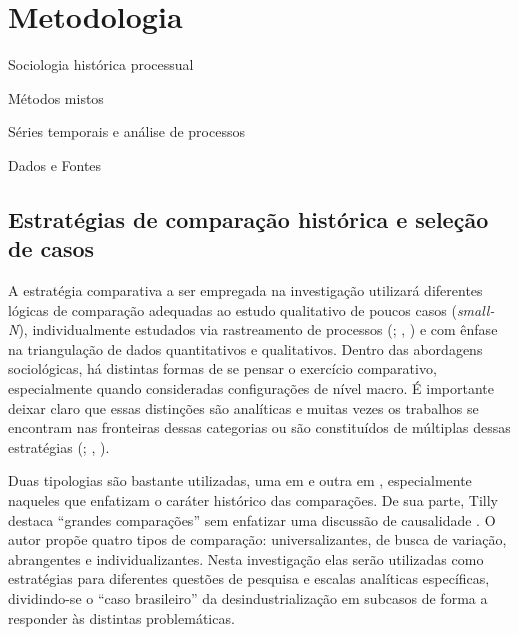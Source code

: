 \chapter{Metodologia}

\begin{esboco}
Sociologia histórica processual

Métodos mistos

Séries temporais e análise de processos

Dados e Fontes
\end{esboco}

\section{Estratégias de comparação histórica e seleção de casos}\label{estratuxe9gias-de-comparauxe7uxe3o-histuxf3rica-e-seleuxe7uxe3o-de-casos}

A estratégia comparativa a ser empregada na investigação utilizará
diferentes lógicas de comparação \citep{tilly_big_1984} adequadas ao
estudo qualitativo de poucos casos (\emph{small-N}), individualmente
estudados via rastreamento de processos (; \citeauthor{mahoney_process_2015}, \citeyear{mahoney_process_2015})
e com ênfase na triangulação de dados quantitativos e qualitativos.
Dentro das abordagens sociológicas, há distintas formas de se pensar o
exercício comparativo, especialmente quando consideradas configurações
de nível macro. É importante deixar claro que essas distinções são
analíticas e muitas vezes os trabalhos se encontram nas fronteiras
dessas categorias ou são constituídos de múltiplas dessas estratégias
(; \citeauthor{tilly_big_1984}, \citeyear{tilly_big_1984}).

Duas tipologias são bastante utilizadas, uma em \citet{tilly_big_1984} e
outra em \citet{skocpol_uses_1980}, especialmente naqueles que enfatizam
o caráter histórico das comparações. De sua parte, Tilly destaca
``grandes comparações'' sem enfatizar uma discussão de causalidade
\citep{tilly_big_1984}. O autor propõe quatro tipos de comparação:
universalizantes, de busca de variação, abrangentes e
individualizantes. Nesta investigação elas serão utilizadas como
estratégias para diferentes questões de pesquisa e escalas analíticas
específicas, dividindo-se o ``caso brasileiro'' da desindustrialização
em subcasos de forma a responder às distintas problemáticas.


